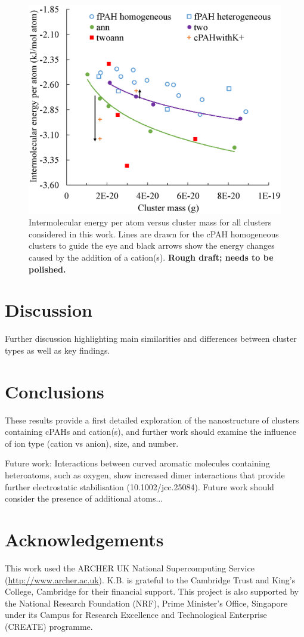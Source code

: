 %
\begin{figure}[!tbh]
\centering
\includegraphics[width=0.5\linewidth]{Figures/energies.eps}
\caption{Intermolecular energy per atom versus cluster mass for all clusters considered in this work. Lines are drawn for the cPAH homogeneous clusters to guide the eye and black arrows show the energy changes caused by the addition of a cation(s). \textbf{Rough draft; needs to be polished.}}
\label{fig:energies}
\end{figure}
%


\section{Discussion}
Further discussion highlighting main similarities and differences between cluster types as well as key findings.



\section{Conclusions}

These results provide a first detailed exploration of the nanostructure of clusters containing cPAHs and cation(s), and further work should examine the influence of ion type (cation vs anion), size, and number.

Future work:
Interactions between curved aromatic molecules containing heteroatoms, such as oxygen, show increased dimer interactions that provide further electrostatic stabilisation (10.1002/jcc.25084).  Future work should consider the presence of additional atoms...



\section*{Acknowledgements}
This work used the ARCHER UK National Supercomputing Service (\url{http://www.archer.ac.uk}).
K.B. is grateful to the Cambridge Trust and King's College, Cambridge for their financial support.
This project is also supported by the National Research Foundation (NRF), Prime Minister's Office, Singapore under its Campus for Research Excellence and Technological Enterprise (CREATE) programme.

